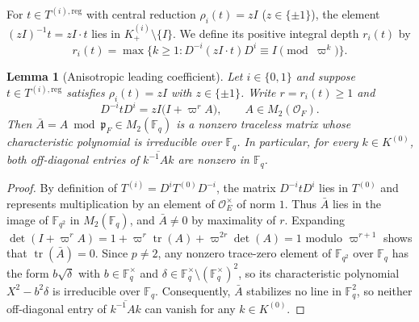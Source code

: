 \documentclass[12pt, letterpaper]{article}
\numberwithin{equation}{section}
\newtheorem{lemma}[theorem]{Lemma}
\theoremstyle{definition}
\theoremstyle{remark}
\newcommand{\OO}{\mathcal{O}_F}
\newcommand{\kk}{\mathbb{F}_q}
\newcommand{\tr}{\operatorname{tr}}
\begin{document}
For $t\in T^{(i),\mathrm{reg}}$ with central reduction $\rho_i(t)=zI$ ($z\in\{\pm 1\}$), the element $(zI)^{-1}t=zI\cdot t$ lies in $K^{(i)}_+\setminus\{I\}$. We define its positive integral depth $r_i(t)$ by
\begin{equation}\label{eq:ri-def}
 r_i(t)=\max\bigl\{k\ge 1: D^{-i}(zI\cdot t)D^i\equiv I\pmod{\varpi^k}\bigr\}.
\end{equation}

\begin{lemma}[Anisotropic leading coefficient]\label{lem:anisotropic}
Let $i\in\{0,1\}$ and suppose $t\in T^{(i),\mathrm{reg}}$ satisfies $\rho_i(t)=zI$ with $z\in\{\pm 1\}$. Write $r=r_i(t)\ge 1$ and
\begin{equation}\label{eq:leading-expansion}
 D^{-i}tD^i=zI\bigl(I+\varpi^r A\bigr),\qquad A\in M_2(\OO).
\end{equation}
Then $\bar{A}=A\bmod\mathfrak{p}_F\in M_2(\kk)$ is a nonzero traceless matrix whose characteristic polynomial is irreducible over $\kk$. In particular, for every $k\in K^{(0)}$, both off-diagonal entries of $\overline{k^{-1}Ak}$ are nonzero in $\kk$.
\end{lemma}
\begin{proof}
By definition of $T^{(i)}=D^iT^{(0)}D^{-i}$, the matrix $D^{-i}tD^i$ lies in $T^{(0)}$ and represents multiplication by an element of $\mathcal{O}_E^\times$ of norm $1$. Thus $\bar{A}$ lies in the image of $\mathbb{F}_{q^2}$ in $M_2(\kk)$, and $\bar{A}\ne 0$ by maximality of $r$. Expanding $\det(I+\varpi^r A)=1+\varpi^r\tr(A)+\varpi^{2r}\det(A)=1$ modulo $\varpi^{r+1}$ shows that $\tr(\bar{A})=0$. Since $p\ne 2$, any nonzero trace-zero element of $\mathbb{F}_{q^2}$ over $\kk$ has the form $b\sqrt{\delta}$ with $b\in\kk^\times$ and $\delta\in\kk^\times\setminus(\kk^\times)^2$, so its characteristic polynomial $X^2-b^2\delta$ is irreducible over $\kk$. Consequently, $\bar{A}$ stabilizes no line in $\kk^2$, so neither off-diagonal entry of $\overline{k^{-1}Ak}$ can vanish for any $k\in K^{(0)}$.
\end{proof}
\end{document}
